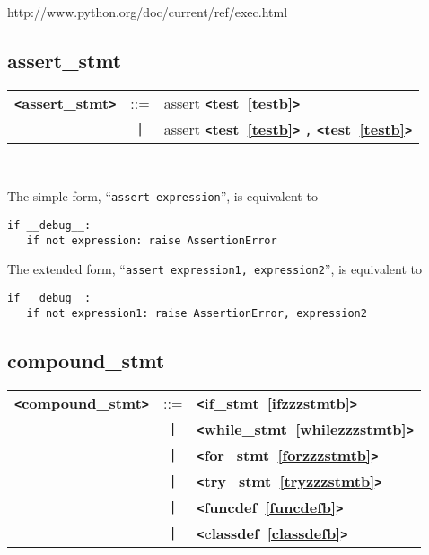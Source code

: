 \documentclass[12pt]{article}
\begin{document}
http://www.python.org/doc/current/ref/exec.html

\subsection{assert\_stmt}
\label{assertzzzstmtb}
\begin{tabular}{lcl}
{\bf \verb+<+assert\_stmt\verb+>+} & ::=  & assert {\bf \verb+<+test~\ref{testb}\verb+>+}  \\
 & \verb+|+  & assert {\bf \verb+<+test~\ref{testb}\verb+>+}  \verb|,| {\bf \verb+<+test~\ref{testb}\verb+>+}  \\
\end{tabular} \\


The simple form, ``\verb|assert expression|'', is equivalent to 
\begin{verbatim}
if __debug__:
   if not expression: raise AssertionError
\end{verbatim}

 The extended form, ``\verb|assert expression1, expression2|'', is equivalent to 
\begin{verbatim}
if __debug__:
   if not expression1: raise AssertionError, expression2
\end{verbatim}

\subsection{compound\_stmt}
\label{compoundzzzstmtb}
\newlength{\tw}
\settowidth{\tw}{compound\_stmt  ::=  }
\addtolength{\tw}{2\arraycolsep}
\newlength{\len}
\setlength{\len}{\textwidth}
\addtolength{\len}{-1\tw}
\begin{tabular}{lcp{\len}}
{\bf \verb+<+compound\_stmt\verb+>+} & ::=  & {\bf \verb+<+if\_stmt~\ref{ifzzzstmtb}\verb+>+}  \\
 & \verb+|+  & {\bf \verb+<+while\_stmt~\ref{whilezzzstmtb}\verb+>+}  \\
 & \verb+|+  & {\bf \verb+<+for\_stmt~\ref{forzzzstmtb}\verb+>+}  \\
 & \verb+|+  & {\bf \verb+<+try\_stmt~\ref{tryzzzstmtb}\verb+>+}  \\
 & \verb+|+  & {\bf \verb+<+funcdef~\ref{funcdefb}\verb+>+}  \\
 & \verb+|+  & {\bf \verb+<+classdef~\ref{classdefb}\verb+>+}  \\
\end{tabular} \\
\end{document}
